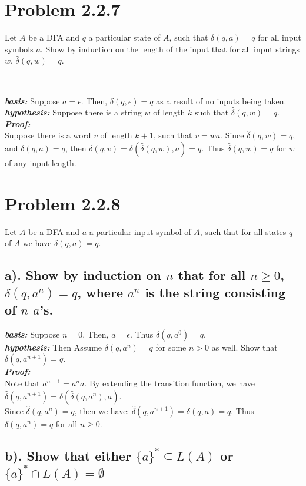 \documentclass[20pt]{article} %
\begin{document}
\section{Problem 2.2.7} 
Let $A$ be a DFA and $q$ a particular state of $A$, such that $\delta(q,a)=q$ for all input symbols $a$. 
Show by induction on the length of the input that for all input strings $w$, $\hat{\delta}(q,w)=q$. \\
\noindent\rule{2cm}{0.4pt} \\

\textbf{\textit{basis:}} Suppose $a = \epsilon$. Then, $\delta(q,\epsilon)=q$ as a result of no inputs being taken. \\
\textbf{\textit{hypothesis:}} Suppose there is a string $w$ of length $k$ such that  $\hat{\delta}(q,w)=q$. \\

\textbf{\textit{Proof:}} \\
Suppose there is a word $v$ of length $k+1$, such that $v = wa$.  Since $\hat{\delta}(q,w)=q$, and $\delta(q,a)=q$, then $\delta(q,v)=\delta(\hat{\delta}(q,w), a)=q$. Thus $\hat{\delta}(q,w)=q$ for $w$ of any input length.


\section{Problem 2.2.8}
Let $A$ be a DFA and $a$ a particular input symbol of $A$, such that for all states $q$ of $A$ we have $\delta(q,a)=q$.

\subsection{a). Show by induction on $n$ that for all $n\geq0$, $\delta(q,a^{n})=q$, where $a^{n}$ is the string consisting of $n$ $a$'s.} 

\textbf{\textit{basis:}} Suppose $n = 0$. Then, $a = \epsilon$. Thus $\delta(q,a^{0})=q$. \\
\textbf{\textit{hypothesis:}} Then Assume $\delta(q,a^{n})=q$ for some $n > 0$ as well. Show that $\delta(q,a^{n+1})=q$. \\ 

\textbf{\textit{Proof:}} \\
Note that $a^{n+1} = a^{n}a$.  By extending the transition function, we have $\hat{\delta}(q,a^{n+1})=\delta(\hat{\delta}(q,a^{n}), a).$ \\
Since $\hat{\delta}(q,a^{n}) = q$, then we have: $\hat{\delta}(q,a^{n+1})=\delta(q, a)=q$. Thus $\delta(q,a^{n})=q$ for all $n \geq 0$.

\subsection{b). Show that either $\{a\}^{*} \subseteq L(A)$ or $\{a\}^{*} \cap L(A) = \emptyset$ }
\end{document}
